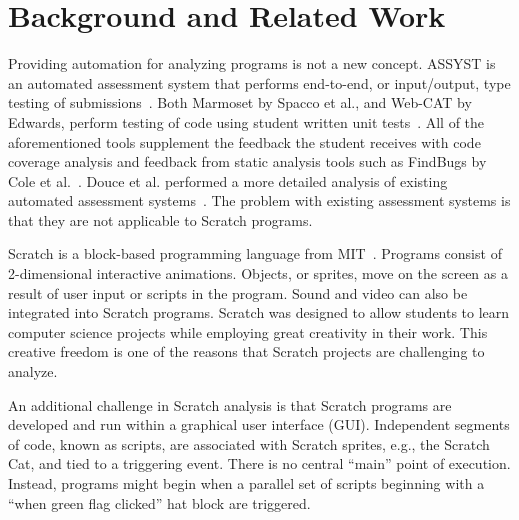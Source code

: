 \section{Background and Related Work}

Providing automation for analyzing programs is not a new concept.  ASSYST is an
automated assessment system that performs end-to-end, or input/output, type
testing of submissions~\cite{Jackson:1997:GSP:268084.268210}. Both Marmoset by
Spacco et al., and Web-CAT by Edwards, perform testing of code using student
written unit tests~\cite{Spacco:2006:EMD:1140124.1140131,
  Edwards:2003:RCS:949344.949390}. All of the aforementioned tools supplement
the feedback the student receives with code coverage analysis and feedback from
static analysis tools such as FindBugs by Cole et
al.~\cite{Cole:2006:IYS:1176617.1176667}. Douce et al. performed a more
detailed analysis of existing automated assessment
systems~\cite{Douce:2005:ATA:1163405.1163409}.  The problem with existing
assessment systems is that they are not applicable to Scratch programs.

Scratch is a block-based programming language from
MIT~\cite{Maloney:2010:SPL:1868358.1868363}.  Programs consist of 2-dimensional
interactive animations.  Objects, or sprites, move on the screen as a result of
user input or scripts in the program.  Sound and video can also be integrated
into Scratch programs.  Scratch was designed to allow students to learn
computer science projects while employing great creativity in their work.  This
creative freedom is one of the reasons that Scratch projects are challenging to
analyze.

An additional challenge in Scratch analysis is that Scratch programs are
developed and run within a graphical user interface (GUI).  Independent
segments of code, known as scripts, are associated with Scratch sprites, e.g.,
the Scratch Cat, and tied to a triggering event.  There is no central ``main''
point of execution.  Instead, programs might begin when a parallel set of
scripts beginning with a ``when green flag clicked'' hat block are triggered.

